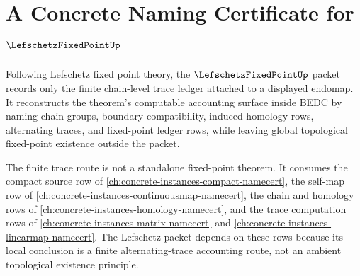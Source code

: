 \chapter{A Concrete Naming Certificate for $\LefschetzFixedPointUp$}
\label{ch:concrete-instances-lefschetz-fixed-point-namecert}

Following Lefschetz fixed point theory, the $\LefschetzFixedPointUp$ packet records only the finite chain-level trace ledger attached to a displayed endomap. It reconstructs the theorem's computable accounting surface inside BEDC by naming chain groups, boundary compatibility, induced homology rows, alternating traces, and fixed-point ledger rows, while leaving global topological fixed-point existence outside the packet.

The finite trace route is not a standalone fixed-point theorem. It consumes the compact source row of \autoref{ch:concrete-instances-compact-namecert}, the self-map row of \autoref{ch:concrete-instances-continuousmap-namecert}, the chain and homology rows of \autoref{ch:concrete-instances-homology-namecert}, and the trace computation rows of \autoref{ch:concrete-instances-matrix-namecert} and \autoref{ch:concrete-instances-linearmap-namecert}. The Lefschetz packet depends on these rows because its local conclusion is a finite alternating-trace accounting route, not an ambient topological existence principle.

